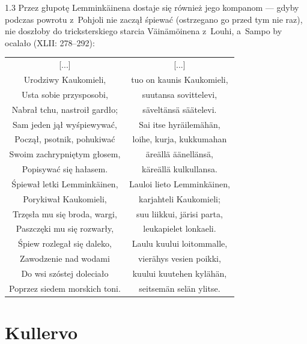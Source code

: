 \documentclass[11pt,a4paper,twoside]{report}
\begin{document}
\begin{spacing}{1.3}
Przez głupotę Lemminkäinena dostaje się również jego kompanom --- gdyby podczas powrotu z~Pohjoli nie zaczął śpiewać (ostrzegano go przed tym nie raz), nie doszłoby do tricksterskiego starcia Väinämöinena z~Louhi, a~Sampo by ocalało (XLII: 278--292):
\end{spacing}
{\centering
\small
\begin{longtable}{c c}
{[...]} & {[...]} \\
Urodziwy Kaukomieli, & tuo on kaunis Kaukomieli, \\
Usta sobie przysposobi, & suutansa sovittelevi, \\
Nabrał tchu, nastroił gardło; & säveltänsä säätelevi. \\
Sam jeden jął wyśpiewywać, & Sai itse hyräilemähän, \\
Począł, psotnik, pohukiwać & loihe, kurja, kukkumahan \\
Swoim zachrypniętym głosem, & äreällä äänellänsä, \\
Popisywać się hałasem. & käreällä kulkullansa. \\
Śpiewał letki Lemminkäinen, & Lauloi lieto Lemminkäinen, \\
Porykiwał Kaukomieli, & karjahteli Kaukomieli; \\
Trzęsła mu się broda, wargi, & suu liikkui, järisi parta, \\
Paszczęki mu się rozwarły, & leukapielet lonkaeli. \\
Śpiew rozlegał się daleko, & Laulu kuului loitommalle, \\
Zawodzenie nad wodami & vierähys vesien poikki, \\
Do wsi szóstej doleciało & kuului kuutehen kylähän, \\
Poprzez siedem morskich toni. & seitsemän selän ylitse. \\
\end{longtable}
}
\newpage
\section{Kullervo}
\vspace*{0.5\baselineskip}
\end{document}
